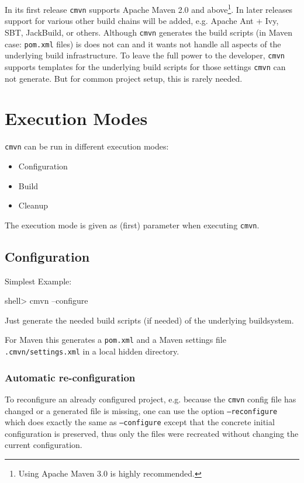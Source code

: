 \documentclass[a4paper,12pt,english,oneside,halfparskip]{scrartcl}
\newcommand{\CMVN}{\texttt{cmvn}}
\newcommand{\cmvn}{\texttt{cmvn}}
\newcommand{\code}[1]{\texttt{#1}}
\newcommand{\pom}{\code{pom.xml}}
\begin{document}
In its first release \CMVN{} supports Apache Maven 2.0 and above\footnote{Using Apache Maven 3.0 is highly recommended.}. In later releases support for various other build chains will be added, e.g. Apache Ant + Ivy, SBT, JackBuild, or others. Although \CMVN{} generates the build scripts (in Maven case: \pom{} files) is does not can and it wants not handle all aspects of the underlying build infrastructure. To leave the full power to the developer, \CMVN{} supports templates for the underlying build scripts for those settings \CMVN{} can not generate. But for common project setup, this is rarely needed.

\section{Execution Modes}

\CMVN{} can be run in different execution modes:

\begin{itemize}
 \item Configuration
 \item Build
 \item Cleanup
\end{itemize}

The execution mode is given as (first) parameter when executing \CMVN{}.



\subsection{Configuration}

Simplest Example: 

\begin{Cmdline}
shell> cmvn --configure
\end{Cmdline}

Just generate the needed build scripts (if needed) of the underlying buildsystem.

For Maven this generates a \pom{} and a Maven settings file \code{.cmvn/settings.xml} in a local hidden directory.

\subsubsection{Automatic re-configuration}

To reconfigure an already configured project, e.g. because the \cmvn{} config file has changed or a generated file is missing, one can use the option \code{--reconfigure} which does exactly the same as \code{--configure} except that the concrete initial configuration is preserved, thus only the files were recreated without changing the current configuration. 
\end{document}
